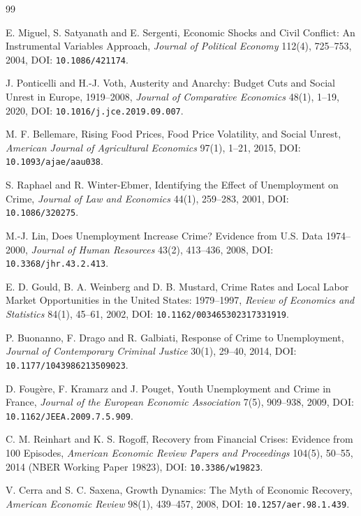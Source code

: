 \documentclass[12pt]{article}
\theoremstyle{plain}
\begin{document}
\begin{thebibliography}{99}

 E. Miguel, S. Satyanath and E. Sergenti, Economic Shocks and Civil Conflict: An Instrumental Variables Approach, \emph{Journal of Political Economy} 112(4), 725--753, 2004, DOI: \texttt{10.1086/421174}.

 J. Ponticelli and H.-J. Voth, Austerity and Anarchy: Budget Cuts and Social Unrest in Europe, 1919--2008, \emph{Journal of Comparative Economics} 48(1), 1--19, 2020, DOI: \texttt{10.1016/j.jce.2019.09.007}.

 M. F. Bellemare, Rising Food Prices, Food Price Volatility, and Social Unrest, \emph{American Journal of Agricultural Economics} 97(1), 1--21, 2015, DOI: \texttt{10.1093/ajae/aau038}.

 S. Raphael and R. Winter-Ebmer, Identifying the Effect of Unemployment on Crime, \emph{Journal of Law and Economics} 44(1), 259--283, 2001, DOI: \texttt{10.1086/320275}.

 M.-J. Lin, Does Unemployment Increase Crime? Evidence from U.S. Data 1974--2000, \emph{Journal of Human Resources} 43(2), 413--436, 2008, DOI: \texttt{10.3368/jhr.43.2.413}.

 E. D. Gould, B. A. Weinberg and D. B. Mustard, Crime Rates and Local Labor Market Opportunities in the United States: 1979--1997, \emph{Review of Economics and Statistics} 84(1), 45--61, 2002, DOI: \texttt{10.1162/003465302317331919}.

 P. Buonanno, F. Drago and R. Galbiati, Response of Crime to Unemployment, \emph{Journal of Contemporary Criminal Justice} 30(1), 29--40, 2014, DOI: \texttt{10.1177/1043986213509023}.

 D. Foug\`ere, F. Kramarz and J. Pouget, Youth Unemployment and Crime in France, \emph{Journal of the European Economic Association} 7(5), 909--938, 2009, DOI: \texttt{10.1162/JEEA.2009.7.5.909}.

 C. M. Reinhart and K. S. Rogoff, Recovery from Financial Crises: Evidence from 100 Episodes, \emph{American Economic Review Papers and Proceedings} 104(5), 50--55, 2014 (NBER Working Paper 19823), DOI: \texttt{10.3386/w19823}.

 V. Cerra and S. C. Saxena, Growth Dynamics: The Myth of Economic Recovery, \emph{American Economic Review} 98(1), 439--457, 2008, DOI: \texttt{10.1257/aer.98.1.439}.


\end{thebibliography}
\end{document}
